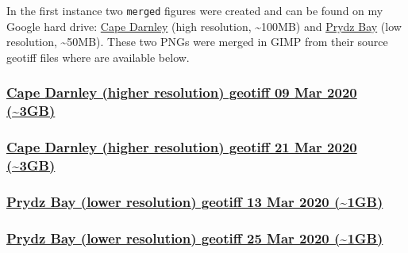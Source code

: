 \documentclass[11pt]{article}
\begin{document}
In the first instance two \texttt{merged} figures were created and can be
found on my Google hard drive: \href{https://drive.google.com/file/d/12rBVi-qdNDChf6J3M1tdehBGgWYahPi4/view?usp=sharing}{Cape Darnley} (high resolution, \textasciitilde{}100MB) and
\href{https://drive.google.com/file/d/1n-bSFUpUhzv7L2\_1GMLRy7NRP9oeFEXM/view?usp=sharing}{Prydz Bay} (low resolution, \textasciitilde{}50MB). These two PNGs were merged in GIMP from
their source geotiff files where are available below.

\subsubsection{\href{https://drive.google.com/file/d/1n39IWX\_VriVqEc3Dnr65nqIvBzBSVOhi/view?usp=sharing}{Cape Darnley (higher resolution) geotiff 09 Mar 2020 (\textasciitilde{}3GB)}}
\label{sec:org5bfc6e1}

\subsubsection{\href{https://drive.google.com/file/d/1n7ltcEQMj62ggmRoHuCI3\_toXb4tI65B/view?usp=sharing}{Cape Darnley (higher resolution) geotiff 21 Mar 2020 (\textasciitilde{}3GB)}}
\label{sec:org30509fd}

\subsubsection{\href{https://drive.google.com/file/d/1n91zwi\_NVX\_pkzerxvoOw9oGFZ-ypAWP/view?usp=sharing}{Prydz Bay (lower resolution) geotiff 13 Mar 2020 (\textasciitilde{}1GB)}}
\label{sec:orgd2d6a72}

\subsubsection{\href{https://drive.google.com/file/d/1nHceOG3D\_eweceIcVhg6Ex5nviDYZ09l/view?usp=sharing}{Prydz Bay (lower resolution) geotiff 25 Mar 2020 (\textasciitilde{}1GB)}}
\label{sec:org58191aa}
\end{document}
